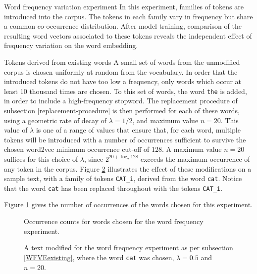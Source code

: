 \documentclass{article} %
\newcommand{\word}[1]{\texttt{#1}}
\begin{document}
\begin{section}{Word frequency variation experiment}\label{WFVE}
In this experiment, families of tokens are introduced into the corpus.
The tokens in each family vary in frequency but share a common co-occurrence distribution.
After model training, comparison of the resulting word vectors associated to these tokens reveals the independent effect of frequency variation on the word embedding.

\begin{subsection}{Tokens derived from existing words}\label{WFVEexisting}
A small set of words from the unmodified corpus is chosen uniformly at random from the vocabulary.
In order that the introduced tokens do not have too low a frequency, only words which occur at least 10 thousand times are chosen.
To this set of words, the word \word{the} is added, in order to include a high-frequency stopword.
The replacement procedure of subsection \ref{replacement-procedure} is then performed for each of these words, using a geometric rate of decay of $\lambda = 1/2$, and maximum value $n=20$.
This value of $\lambda$ is one of a range of values that ensure that, for each word, multiple tokens will be introduced with a number of occurrences sufficient to survive the chosen word2vec minimum occurrence cut-off of 128.  
A maximum value $n=20$ suffices for this choice of $\lambda$, since $2^{20 + \log_2{128}}$ exceeds the maximum occurrence of any token in the corpus. 
Figure \ref{fig:word-frequency-experiment-text-cat} illustrates the effect of these modifications on a sample text, with a family of tokens \word{CAT\_i}, derived from the word \word{cat}.
Notice that the word \word{cat} has been replaced throughout with the tokens \word{CAT\_i}.

Figure \ref{fig:word-frequency-counts} gives the number of occurrences of the words chosen for this experiment.

\begin{figure}\label{fig:word-frequency-counts}
	
	\caption{Occurrence counts for words chosen for the word frequency experiment. }
\end{figure}

\begin{figure}
	
	\caption{A text modified for the word frequency experiment as per subsection \ref{WFVEexisting}, where the
	word \word{cat} was chosen, $\lambda=0.5$ and $n=20$.}
	\label{fig:word-frequency-experiment-text-cat}
\end{figure}


\end{subsection}
\end{section}
\end{document}
